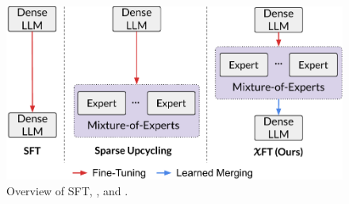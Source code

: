 \begin{figure}[t]
\centering
\includegraphics[width=1.0\linewidth]{assets/comparison.pdf}
\caption{Overview of SFT, \sparseupcycle, and \ours.}
\label{fig:comparison}
\end{figure}
